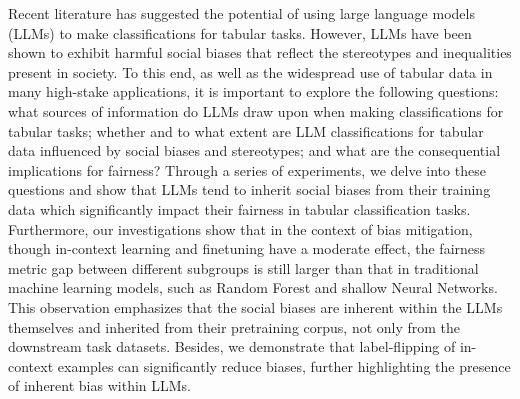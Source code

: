 Recent literature has suggested the potential of using large language models (LLMs) to make classifications for tabular tasks. However, LLMs have been shown to exhibit harmful social biases that reflect the stereotypes and inequalities present in society. To this end, as well as the widespread use of tabular data in many high-stake applications, it is important to explore the following questions: what sources of information do LLMs draw upon when making classifications for tabular tasks; whether and to what extent are LLM classifications for tabular data influenced by social biases and stereotypes; and what are the consequential implications for fairness? Through a series of experiments, we delve into these questions and show that LLMs tend to inherit social biases from their training data which significantly impact their fairness in tabular classification tasks. Furthermore, our investigations show that in the context of bias mitigation, though in-context learning and finetuning have a moderate effect, the fairness metric gap between different subgroups is still larger than that in traditional machine learning models, such as Random Forest and shallow Neural Networks. This observation emphasizes that the social biases are inherent within the LLMs themselves and inherited from their pretraining corpus, not only from the downstream task datasets. Besides, we demonstrate that label-flipping of in-context examples can significantly reduce biases, further highlighting the presence of inherent bias within LLMs.